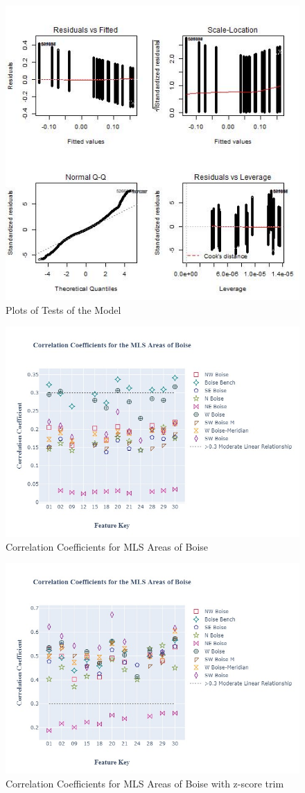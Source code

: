 \documentclass{article}
\begin{document}
\begin{figure}[H]
    \centering
    \includegraphics[width= .8\linewidth]{images/plot_matrix.jpeg}
    \caption{Plots of Tests of the Model}
    \label{fig: student_resid}
\end{figure}




\begin{figure}[H]
    \centering
    \includegraphics[width= .7\linewidth]{images/Area_fig.jpg}
    \caption{Correlation Coefficients for MLS Areas of Boise}
    \label{fig: area_ccl}
\end{figure}

\begin{figure}[H]
    \centering
    \includegraphics[width= .7\linewidth]{images/Ex_Area_fig.jpg}
    \caption{Correlation Coefficients for MLS Areas of Boise with z-score trim}
    \label{fig: area_ccl-z}
\end{figure}
\end{document}
